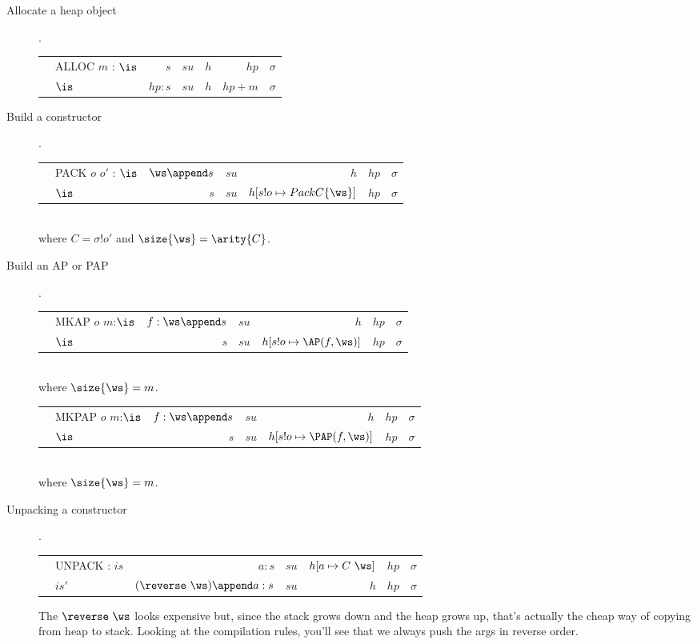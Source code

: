\documentclass[11pt]{article}
\begin{document}
\begin{description}

\item[ Allocate a heap object ].

\begin{tabular}{|llrrrrr|}
\hline
	& ALLOC $m$ : $\is$	& $s$    & $su$ & $h$ & $hp$   & $\sigma$ \\
\next	& $\is$			& $hp:s$ & $su$ & $h$ & $hp+m$ & $\sigma$ \\
\hline
\end{tabular}

\item[ Build a constructor ].

\begin{tabular}{|llrrrrr|}
\hline
	& PACK $o$ $o'$ : $\is$	& $\ws \append s$ 	& $su$ & $h$ 				& $hp$ & $\sigma$ \\
\next	& $\is$			& $s$ 			& $su$ & $h[s!o \mapsto Pack C\{\ws\}]$	& $hp$ & $\sigma$ \\
\hline
\end{tabular}
\\
where $C = \sigma!o'$ and $\size{\ws} = \arity{C}$.

\item[ Build an AP or  PAP ].

\begin{tabular}{|llrrrrr|}
\hline
	& MKAP $o$ $m$:$\is$	& $f : \ws \append s$	& $su$ & $h$ 				& $hp$ & $\sigma$ \\
\next	& $\is$			& $s$ 			& $su$ & $h[s!o \mapsto \AP(f,\ws)]$ 	& $hp$ & $\sigma$ \\
\hline
\end{tabular}
\\
where $\size{\ws} = m$.

\begin{tabular}{|llrrrrr|}
\hline
	& MKPAP $o$ $m$:$\is$	& $f : \ws \append s$	& $su$ & $h$ 				& $hp$ & $\sigma$ \\
\next	& $\is$			& $s$ 			& $su$ & $h[s!o \mapsto \PAP(f,\ws)]$ 	& $hp$ & $\sigma$ \\
\hline
\end{tabular}
\\
where $\size{\ws} = m$.

\item[ Unpacking a constructor ].

\begin{tabular}{|llrrrrr|}
\hline
	& UNPACK : $is$ 	& $a : s$ 				& $su$ & $h[a \mapsto C\ \ws]$  	& $hp$ & $\sigma$ \\
\next	& $is'$			& $(\reverse\ \ws) \append a : s$ 	& $su$ & $h$ 				& $hp$ & $\sigma$ \\
\hline
\end{tabular}

The $\reverse\ \ws$ looks expensive but, since the stack grows down
and the heap grows up, that's actually the cheap way of copying from
heap to stack.  Looking at the compilation rules, you'll see that we
always push the args in reverse order.

\end{description}
\end{document}
